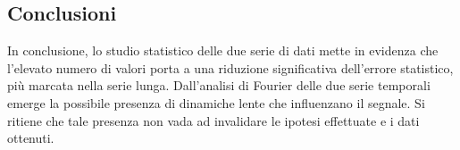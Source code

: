 \subsection{Conclusioni}
In conclusione, lo studio statistico delle due serie di dati mette in evidenza che l'elevato numero di valori porta a una riduzione significativa dell'errore statistico, più marcata nella serie lunga. Dall'analisi di Fourier delle due serie temporali emerge la possibile presenza di dinamiche lente che influenzano il segnale. Si ritiene che tale presenza non vada ad invalidare le ipotesi effettuate e i dati ottenuti. 